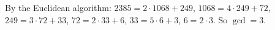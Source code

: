 By the Euclidean algorithm: $2385=2\cdot1068+249$, $1068=4\cdot249+72$, $249=3\cdot72+33$, $72=2\cdot33+6$, $33=5\cdot6+3$, $6=2\cdot3$. So $\gcd=\boxed{3}$.
